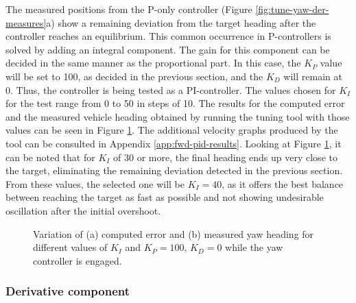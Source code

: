 The measured positions from the P-only controller (Figure \ref{fig:tune-yaw-der-measures}a) show a remaining deviation from the target heading after the controller reaches an equilibrium. This common occurrence in P-controllers is solved by adding an integral component. The gain for this component can be decided in the same manner as the proportional part. In this case, the $K_P$ value will be set to 100, as decided in the previous section, and the $K_D$ will remain at 0. Thus, the controller is being tested as a PI-controller. The values chosen for $K_I$ for the test range from 0 to 50 in steps of 10. The results for the computed error and the measured vehicle heading obtained by running the tuning tool with those values can be seen in Figure \ref{fig:tune-yaw-int}. The additional velocity graphs produced by the tool can be consulted in Appendix \ref{app:fwd-pid-results}. Looking at Figure \ref{fig:tune-yaw-int}, it can be noted that for $K_I$ of 30 or more, the final heading ends up very close to the target, eliminating the remaining deviation detected in the previous section. From these values, the selected one will be $K_I=40$, as it offers the best balance between reaching the target as fast as possible and not showing undesirable oscillation after the initial overshoot.

\begin{figure}[H]
    \begin{minipage}[t]{0.5\linewidth}
        \centering
        \scalebox{0.55}{}
    \end{minipage}
    \begin{minipage}[t]{0.5\linewidth}
        \centering
        \scalebox{0.55}{}
    \end{minipage}
    \caption{Variation of (a) computed error and (b) measured yaw heading for different values of $K_{I}$ and $K_P=100$, $K_D=0$ while the yaw controller is engaged.}
    \label{fig:tune-yaw-int}
\end{figure}

\subsubsection{Derivative component}

